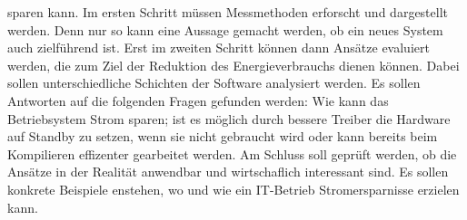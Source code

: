 sparen kann. Im ersten Schritt müssen Messmethoden erforscht und dargestellt werden. Denn nur so kann eine Aussage
gemacht werden, ob ein neues System auch zielführend ist. Erst im zweiten Schritt können dann
Ansätze evaluiert werden, die zum Ziel der Reduktion des Energieverbrauchs dienen können. 
Dabei sollen unterschiedliche Schichten der Software analysiert werden. Es sollen Antworten auf die folgenden Fragen gefunden werden:
Wie kann das Betriebsystem Strom sparen; ist es möglich durch bessere Treiber die Hardware auf Standby zu setzen, wenn sie nicht gebraucht wird
oder kann bereits beim Kompilieren effizenter gearbeitet werden. Am Schluss soll geprüft werden,
ob die Ansätze in der Realität anwendbar und wirtschaflich interessant sind. Es sollen konkrete Beispiele enstehen, wo und wie ein
IT-Betrieb Stromersparnisse erzielen kann.

